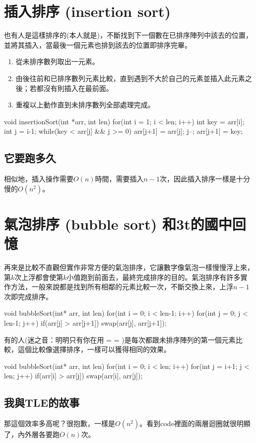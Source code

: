 \section{插入排序 (insertion sort)}
也有人是這樣排序的(本人就是)，不斷找到下一個數在已排序陣列中該去的位置，並將其插入，當最後一個元素也排到該去的位置即排序完畢。
\begin{enumerate}
\item 從未排序數列取出一元素。
\item 由後往前和已排序數列元素比較，直到遇到不大於自己的元素並插入此元素之後；若都沒有則插入在最前面。
\item 重複以上動作直到未排序數列全部處理完成。
\end{enumerate}
\begin{C++}
void insertionSort(int *arr, int len){
    for(int i = 1; i < len; i++){
        int key = arr[i];
        int j = i-1;
        while(key < arr[j] && j >= 0){
            arr[j+1] = arr[j];
            j--;
        }
        arr[j+1] = key;
    }
}
\end{C++}
\subsection{它要跑多久}
相似地，插入操作需要$O(n)$時間，需要插入$n-1$次，因此插入排序一樣是十分慢的$O(n^2)$。

\section{氣泡排序 (bubble sort) 和3t的國中回憶}
再來是比較不直觀但實作非常方便的氣泡排序，它讓數字像氣泡一樣慢慢浮上來，第$k$次上浮都會使第$k$小值跑到前面去，最終完成排序的目的。氣泡排序有許多實作方法，一般來說都是找到所有相鄰的元素比較一次，不斷交換上來，上浮$n-1$次即完成排序。
\begin{C++}
void bubbleSort(int* arr, int len){
    for(int i = 0; i < len-1; i++)
        for(int j = 0; j < len-1; j++)
            if(arr[j] > arr[j+1])
                swap(arr[j], arr[j+1]);
}
\end{C++}
有的人(迷之音：明明只有你在用 = = )是每次都跟未排序陣列的第一個元素比較，這個比較像選擇排序，一樣可以獲得相同的效果。
\begin{C++}
void bubbleSort(int* arr, int len){
    for(int i = 0; i < len; i++)
        for(int j = i+1; j < len; j++)
            if(arr[i] > arr[j])
                swap(arr[i], arr[j]);
}
\end{C++}
\subsection{我與TLE的故事}
那這個效率多高呢？很抱歉，一樣是$O(n^2)$。看到code裡面的兩層迴圈就很明顯了，內外層各要跑$O(n)$次。

